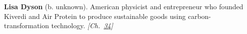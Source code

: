 \textbf{Lisa Dyson} (b. unknown). American physicist and entrepreneur who founded Kiverdi and Air Protein to produce sustainable goods using carbon-transformation technology. \emph{[Ch.~\hyperref[ch:boltzmannbrain]{34}]}

